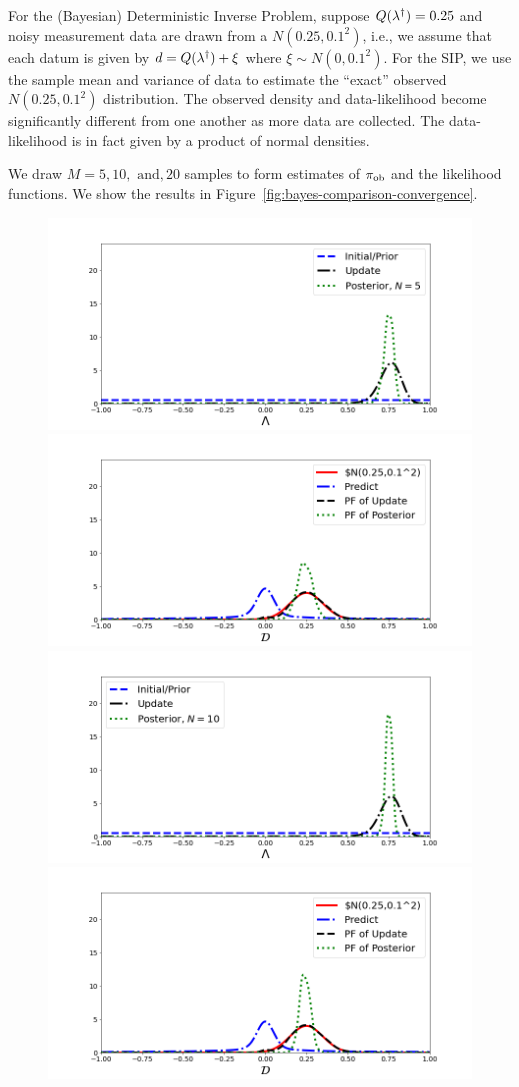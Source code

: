 \begin{ex}
For the (Bayesian) Deterministic Inverse Problem, suppose $Q(\lambda^\dagger)=0.25$ and noisy measurement data are drawn from a $N(0.25,0.1^2)$, i.e., we assume that each datum is given by $d=Q(\lambda^\dagger)+\xi$ where $\xi\sim N(0,0.1^2)$.
For the SIP, we use the sample mean and variance of data to estimate the ``exact'' observed $N(0.25,0.1^2)$ distribution.
The observed density and data-likelihood become significantly different from one another as more data are collected.
The data-likelihood is in fact given by a product of normal densities.

We draw $M=5, 10, \text{ and}, 20$ samples to form estimates of $\operatorname*{\pi_{ob}}$ and the likelihood functions.
We show the results in Figure~\ref{fig:bayes-comparison-convergence}.

\begin{figure}[htbp]
\centering
   \includegraphics[width=0.49\linewidth]{figures/bip-vs-sip-5.png}
   \includegraphics[width=0.49\linewidth]{figures/bip-vs-sip-pf-5.png}
   \includegraphics[width=0.49\linewidth]{figures/bip-vs-sip-10.png}
   \includegraphics[width=0.49\linewidth]{figures/bip-vs-sip-pf-10.png}

\end{figure}
\end{ex}
